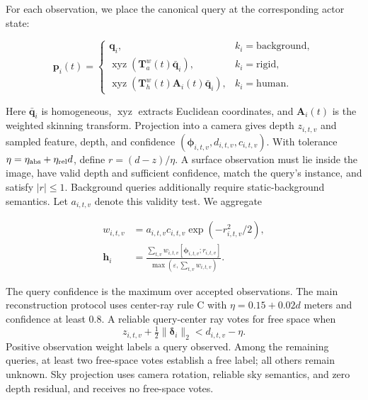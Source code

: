 For each observation, we place the canonical query at the corresponding actor state:

\begin{equation}
\mathbf p_i(t)=
\begin{cases}
\mathbf q_i,& k_i=\mathrm{background},\\
\operatorname{xyz}(\mathbf T^w_a(t)\bar{\mathbf q}_i),& k_i=\mathrm{rigid},\\
\operatorname{xyz}(\mathbf T^w_h(t)\mathbf A_i(t)\bar{\mathbf q}_i),& k_i=\mathrm{human}.
\end{cases}
\label{eq:query-placement}
\end{equation}

Here $\bar{\mathbf q}_i$ is homogeneous, $\operatorname{xyz}$ extracts Euclidean coordinates, and $\mathbf A_i(t)$ is the weighted skinning transform. Projection into a camera gives depth $z_{i,t,v}$ and sampled feature, depth, and confidence $(\boldsymbol\phi_{i,t,v},d_{i,t,v},c_{i,t,v})$. With tolerance $\eta=\eta_{\rm abs}+\eta_{\rm rel}d$, define $r=(d-z)/\eta$. A surface observation must lie inside the image, have valid depth and sufficient confidence, match the query's instance, and satisfy $|r|\leq1$. Background queries additionally require static-background semantics. Let $a_{i,t,v}$ denote this validity test. We aggregate

\begin{align}
w_{i,t,v}&=a_{i,t,v}c_{i,t,v}\exp(-r_{i,t,v}^2/2),\\
\mathbf h_i&=\frac{\sum_{t,v}w_{i,t,v}[\boldsymbol\phi_{i,t,v};r_{i,t,v}]}
{\max(\varepsilon,\sum_{t,v}w_{i,t,v})}.
\label{eq:aggregation}
\end{align}


The query confidence is the maximum over accepted observations. The main reconstruction protocol uses center-ray rule C with $\eta=0.15+0.02d$ meters and confidence at least 0.8. A reliable query-center ray votes for free space when
\begin{equation}
z_{i,t,v}+\tfrac12\|\boldsymbol\delta_i\|_2<d_{i,t,v}-\eta.
\label{eq:free-space}
\end{equation}
Positive observation weight labels a query observed. Among the remaining queries, at least two free-space votes establish a free label; all others remain unknown. Sky projection uses camera rotation, reliable sky semantics, and zero depth residual, and receives no free-space votes.

